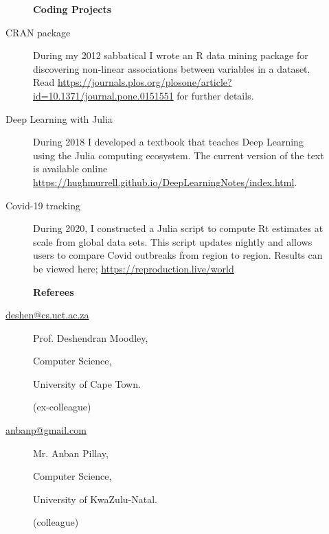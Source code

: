 \documentclass[12pt]{article}
\begin{document}
\newpage
\begin{multicols}{2}

\begin{description}\item[] \begin{description}\item[] {\large \bf  Coding Projects }
\item[CRAN package ]
	During my 2012 sabbatical I wrote an R data mining package for discovering
	non-linear associations between variables in a dataset. Read 
	\url{https://journals.plos.org/plosone/article?id=10.1371/journal.pone.0151551}       
	for further details.
\item[Deep Learning with Julia]
        During 2018 I developed a textbook 
        that teaches Deep Learning using the Julia computing ecosystem. 
        The current version of the text is available online \url{https://hughmurrell.github.io/DeepLearningNotes/index.html}.
\item[Covid-19 tracking ]
	During 2020, I constructed a Julia script
	to compute Rt estimates at scale from global data sets. This script updates
	nightly and allows users to compare Covid outbreaks from region to region.
	Results can be viewed here; \url{https://reproduction.live/world}
 \end{description}
\end{description}


\begin{description}\item[] \begin{description}\item[] {\large \bf  Referees  }

\item[\url{deshen@cs.uct.ac.za}] 
 \item[] Prof. Deshendran Moodley, 
 \item[] Computer Science, 
 \item[] University of Cape Town.
\item[] (ex-colleague)
\item[]

\item[\url{anbanp@gmail.com}] 
 \item[] Mr. Anban Pillay,
 \item[] Computer Science,
 \item[] University of KwaZulu-Natal.
 \item[] (colleague) 
\item[]




\end{description}
\end{description}
\end{multicols}
\end{document}

